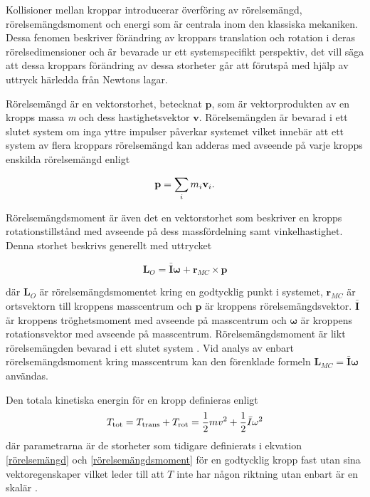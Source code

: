 Kollisioner mellan kroppar introducerar överföring av rörelsemängd, rörelsemängdsmoment och energi som är centrala inom den klassiska mekaniken. Dessa fenomen beskriver förändring av kroppars translation och rotation i deras rörelsedimensioner och är bevarade ur ett systemspecifikt perspektiv, det vill säga att dessa kroppars förändring av dessa storheter går att förutspå med hjälp av uttryck härledda från Newtons lagar. 

Rörelsemängd är en vektorstorhet, betecknat $\mathbf{p}$, som är vektorprodukten av en kropps massa \emph{m} och dess hastighetsvektor $\mathbf{v}$. Rörelsemängden är bevarad i ett slutet system om inga yttre impulser påverkar systemet vilket innebär att ett system av flera kroppars rörelsemängd kan adderas med avseende på varje kropps enskilda rörelsemängd enligt \cite{Meriam_Kraige_Bolton_2020} %

\begin{equation} \label{rörelsemängd}
    \mathbf{p}= \sum_i m_i\mathbf{v}_i\text.
\end{equation}

Rörelsemängdsmoment är även det en vektorstorhet som beskriver en kropps rotationstillstånd med avseende på dess massfördelning samt vinkelhastighet. Denna storhet beskrivs generellt med uttrycket

\begin{equation} \label{rörelsemängdsmoment}
    \mathbf{L}_{O}   = \bar{\mathbf{I}}\boldsymbol{\omega} + \mathbf{r}_{MC} \times \mathbf{p}
\end{equation}

där $\mathbf{L}_{O}$ är rörelsemängdsmomentet kring en godtycklig punkt i systemet, $\mathbf{r}_{MC}$ är ortsvektorn till kroppens masscentrum och $\mathbf{p}$ är kroppens rörelsemängdsvektor. $\bar{\mathbf{I}}$ är kroppens tröghetsmoment med avseende på masscentrum och $\boldsymbol{\omega}$ är kroppens rotationsvektor med avseende på masscentrum. Rörelsemängdsmoment är likt rörelsemängden bevarad i ett slutet system \cite{Meriam_Kraige_Bolton_2020}. Vid analys av enbart rörelsemängdsmoment kring masscentrum kan den förenklade formeln $\mathbf{L}_{MC} = \bar{\mathbf{I}}\boldsymbol{\omega}$ användas. 

Den totala kinetiska energin för en kropp definieras enligt
 \begin{equation}\label{kinetiskenergi}
     T_{\text{tot}} = T_{\text{trans}}+T_{\text{rot}} = \frac{1}{2}mv^2 + \frac{1}{2}\Bar{I}\omega^2
 \end{equation}
där parametrarna är de storheter som tidigare definierats i ekvation \eqref{rörelsemängd} och \eqref{rörelsemängdsmoment} för en godtycklig kropp fast utan sina vektoregenskaper vilket leder till att $T$ inte har någon riktning utan enbart är en skalär \cite{Meriam_Kraige_Bolton_2020}.

